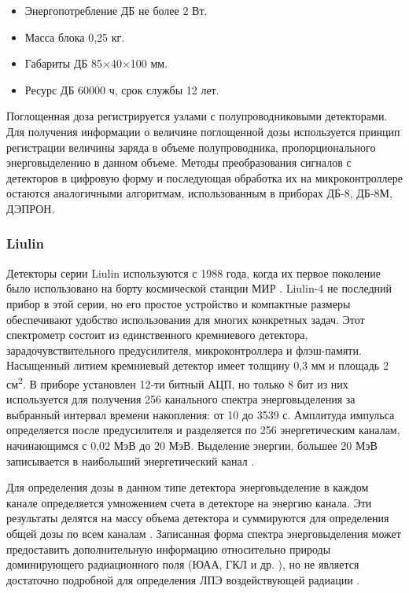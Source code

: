 \begin{itemize}
\item Энергопотребление ДБ не более 2 Вт.
\item Масса блока 0,25 кг.
\item Габариты ДБ 85×40×100 мм. 
\item Ресурс ДБ  60000 ч, срок службы 12 лет.
\end{itemize}


Поглощенная доза регистрируется узлами с полупроводниковыми детекторами. Для получения информации о величине поглощенной дозы используется принцип регистрации величины заряда в объеме полупроводника, пропорционального энерговыделению в данном объеме. Методы преобразования сигналов с детекторов в цифровую форму и последующая обработка их на микроконтроллере остаются аналогичными алгоритмам, использованным в приборах ДБ-8, ДБ-8М, ДЭПРОН.  


\subsubsection{Liulin}

Детекторы серии Liulin используются с 1988 года, когда их первое поколение было использовано на борту космической станции МИР \cite{Caffrey2011}. Liulin-4 не последний прибор в этой серии, но его простое устройство и компактные размеры обеспечивают удобство использования для многих конкретных задач. Этот спектрометр состоит из единственного кремниевого детектора, зарадочувствительного предусилителя, микроконтроллера и флэш-памяти. Насыщенный литием кремниевый детектор имеет толщину 0,3 мм и площадь 2 см\textsuperscript{2}. В приборе установлен 12-ти битный АЦП, но только 8 бит из них используется для получения 256 канального спектра энерговыделения за выбранный интервал времени накопления: от 10 до 3539 с. Амплитуда импульса определяется после предусилителя и разделяется по 256 энергетическим каналам, начинающимся с 0,02 МэВ до 20 МэВ. Выделение энергии, большее 20 МэВ записывается в наибольший энергетический канал \cite{Dachev2002} .


Для определения дозы в данном типе детектора энерговыделение в каждом канале определяется умножением счета в детекторе на энергию канала. Эти результаты делятся на массу объема детектора и суммируются для определения общей дозы по всем каналам \cite{Dachev2002}. Записанная форма спектра энерговыделения может предоставить дополнительную информацию относительно природы доминирующего радиационного поля (ЮАА, ГКЛ и др. ), но не является достаточно подробной для определения ЛПЭ воздействующей радиации \cite{Caffrey2011}. 


